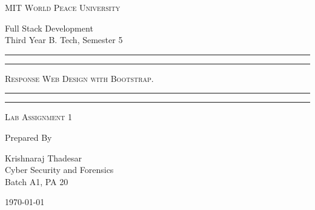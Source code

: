 \documentclass[11pt]{article}
\begin{document}
\begin{titlepage}
    \centering


    \huge\textsc{
        MIT World Peace University
    }\\

    \vspace{0.75\baselineskip} %

    \LARGE{
        Full Stack Development\\
        Third Year B. Tech, Semester 5
    }

    \vfill %


    \rule{\textwidth}{1.6pt}\vspace*{-\baselineskip}\vspace*{2pt}
    \rule{\textwidth}{0.6pt}
    \vspace{0.75\baselineskip} %



    \huge{\textsc{
            Response Web Design with Bootstrap.
        }} \\



    \vspace{0.5\baselineskip} %
    \rule{\textwidth}{0.6pt}\vspace*{-\baselineskip}\vspace*{2.8pt}
    \rule{\textwidth}{1.6pt}

    \vspace{1\baselineskip} %


    \LARGE\textsc{
        Lab Assignment 1
    } %
    \vfill


    Prepared By
    \vspace{0.5\baselineskip} %

    \Large{
        Krishnaraj Thadesar \\
        Cyber Security and Forensics\\
        Batch A1, PA 20
    }


    \vspace{0.5\baselineskip} %
    \today

\end{titlepage}
\end{document}

